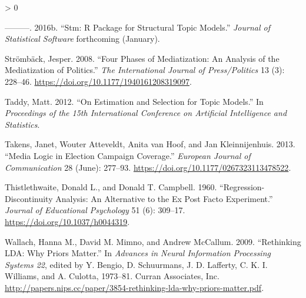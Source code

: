 \documentclass[
  12pt,
]{article}
\newlength{\cslhangindent}
\newenvironment{CSLReferences}[2] %
 {%
  \setlength{\parindent}{0pt}
  \ifodd #1 \everypar{\setlength{\hangindent}{\cslhangindent}}\ignorespaces\fi
  \ifnum #2 > 0
  \setlength{\parskip}{#2\baselineskip}
  \fi
 }%
 {}
\begin{document}
\begin{CSLReferences}{1}{0}
\leavevmode\hypertarget{ref-roberts_stm:_2016}{}%
---------. 2016b. {``Stm: R Package for Structural Topic Models.''}
\emph{Journal of Statistical Software} forthcoming (January).

\leavevmode\hypertarget{ref-stromback_four_2008}{}%
Strömbäck, Jesper. 2008. {``Four Phases of Mediatization: An Analysis of
the Mediatization of Politics.''} \emph{The International Journal of
Press/Politics} 13 (3): 228--46.
\url{https://doi.org/10.1177/1940161208319097}.

\leavevmode\hypertarget{ref-taddy_estimation_2012}{}%
Taddy, Matt. 2012. {``On Estimation and Selection for Topic Models.''}
In \emph{Proceedings of the 15th International Conference on Artificial
Intelligence and Statistics}.

\leavevmode\hypertarget{ref-takens_media_2013}{}%
Takens, Janet, Wouter Atteveldt, Anita van Hoof, and Jan Kleinnijenhuis.
2013. {``Media Logic in Election Campaign Coverage.''} \emph{European
Journal of Communication} 28 (June): 277--93.
\url{https://doi.org/10.1177/0267323113478522}.

\leavevmode\hypertarget{ref-thistlethwaite_regression-discontinuity_1960}{}%
Thistlethwaite, Donald L., and Donald T. Campbell. 1960.
{``Regression-Discontinuity Analysis: An Alternative to the Ex Post
Facto Experiment.''} \emph{Journal of Educational Psychology} 51 (6):
309--17. \url{https://doi.org/10.1037/h0044319}.

\leavevmode\hypertarget{ref-wallach_rethinking_2009}{}%
Wallach, Hanna M., David M. Mimno, and Andrew McCallum. 2009.
{``Rethinking {LDA}: Why Priors Matter.''} In \emph{Advances in Neural
Information Processing Systems 22}, edited by Y. Bengio, D. Schuurmans,
J. D. Lafferty, C. K. I. Williams, and A. Culotta, 1973--81. Curran
Associates, Inc.
\url{http://papers.nips.cc/paper/3854-rethinking-lda-why-priors-matter.pdf}.

\end{CSLReferences}
\end{document}
